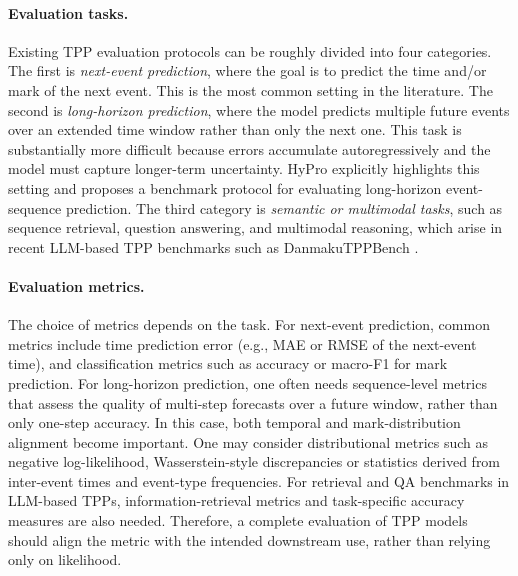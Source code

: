 \documentclass[10pt]{article} %
\begin{document}
\paragraph{Evaluation tasks.}
Existing TPP evaluation protocols can be roughly divided into four categories. The first is \emph{next-event prediction}, where the goal is to predict the time and/or mark of the next event. This is the most common setting in the literature. The second is \emph{long-horizon prediction}, where the model predicts multiple future events over an extended time window rather than only the next one. This task is substantially more difficult because errors accumulate autoregressively and the model must capture longer-term uncertainty. HyPro \citep{xue2022hypro} explicitly highlights this setting and proposes a benchmark protocol for evaluating long-horizon event-sequence prediction. The third category is \emph{semantic or multimodal tasks}, such as sequence retrieval, question answering, and multimodal reasoning, which arise in recent LLM-based TPP benchmarks such as DanmakuTPPBench \citep{jiang2025danmakutppbench}.

\paragraph{Evaluation metrics.}
The choice of metrics depends on the task. For next-event prediction, common metrics include time prediction error (e.g., MAE or RMSE of the next-event time), and classification metrics such as accuracy or macro-F1 for mark prediction. For long-horizon prediction, one often needs sequence-level metrics that assess the quality of multi-step forecasts over a future window, rather than only one-step accuracy. In this case, both temporal and mark-distribution alignment become important. One may consider distributional metrics such as negative log-likelihood, Wasserstein-style discrepancies or statistics derived from inter-event times and event-type frequencies. For retrieval and QA benchmarks in LLM-based TPPs, information-retrieval metrics and task-specific accuracy measures are also needed. Therefore, a complete evaluation of TPP models should align the metric with the intended downstream use, rather than relying only on likelihood. 
\end{document}
